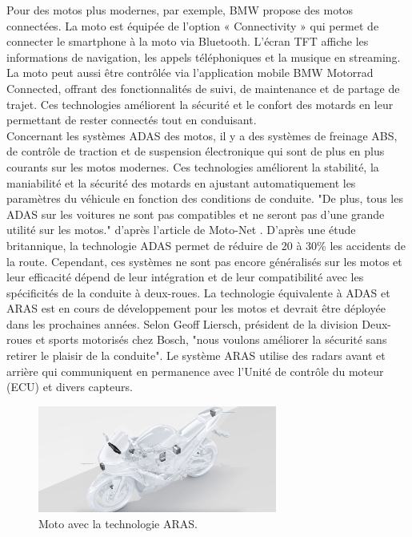 Pour des motos plus modernes, par exemple, BMW propose des motos connectées\cite{bmw_adas}. La moto est équipée de l’option « Connectivity » qui permet de connecter le smartphone à la moto via Bluetooth. L’écran TFT affiche les informations de navigation, les appels téléphoniques et la musique en streaming. La moto peut aussi être contrôlée via l’application mobile BMW Motorrad Connected, offrant des fonctionnalités de suivi, de maintenance et de partage de trajet. Ces technologies améliorent la sécurité et le confort des motards en leur permettant de rester connectés tout en conduisant.\\
Concernant les systèmes ADAS des motos\cite{moto_adas}, il y a des systèmes de freinage ABS, de contrôle de traction et de suspension électronique qui sont de plus en plus courants sur les motos modernes. Ces technologies améliorent la stabilité, la maniabilité et la sécurité des motards en ajustant automatiquement les paramètres du véhicule en fonction des conditions de conduite. "De plus, tous les ADAS sur les voitures ne sont pas compatibles et ne seront pas d’une grande utilité sur les motos." d'après l'article de Moto-Net \cite{moto_adas}.
D'après une étude britannique, la technologie ADAS permet de réduire de 20 à 30\%\cite{moto_aras} les accidents de la route. Cependant, ces systèmes ne sont pas encore généralisés sur les motos et leur efficacité dépend de leur intégration et de leur compatibilité avec les spécificités de la conduite à deux-roues. La technologie équivalente à ADAS et ARAS est en cours de développement pour les motos et devrait être déployée dans les prochaines années.
Selon Geoff Liersch, président de la division Deux-roues et sports motorisés chez Bosch, "nous voulons améliorer la sécurité sans retirer le plaisir de la conduite"\cite{aras_bosh}.
Le système ARAS utilise des radars avant et arrière qui communiquent en permanence avec l’Unité de contrôle du moteur (ECU) et divers capteurs.

\begin{figure}[H]
    \centering
    \includegraphics[width=0.7\textwidth]{images/aras_moto.jpeg} 
    \caption{Moto avec la technologie ARAS.}
\end{figure}

